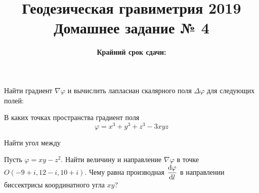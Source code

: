 \documentclass[11pt, a4paper,addpoints]{exam}
\title{{\Large Геодезическая гравиметрия 2019}\\ 
    {\bf\Large Домашнее задание № 4}}
\author{}
\date{\normalsize\bf Крайний срок сдачи: \DTMusedate{deadline}}
\theoremstyle{remark}
\renewcommand{\phi}{\ensuremath{\varphi}}
\begin{document}
\maketitle
\thispagestyle{empty}
\begin{questions}
        \question[1] Найти градиент $\nabla \phi$ и вычислить лапласиан скалярного поля $\Delta \phi$ для следующих полей:
        \question[1] В каких точках пространства градиент поля
        \begin{equation*}
        	\phi = x^3 + y^3 + z^3 - 3xyz
        \end{equation*}
        \question[1] Найти угол между
        \question[2] Пусть $ \phi = xy - z^2$. Найти величину и направление $\nabla \phi$  в точке $O(-9+i, 12-i, 10+i)$. Чему равна производная $\dfrac{\dif \phi}{\dif l}$ в направлении биссектрисы координатного угла $xy$?
\end{questions}
\end{document}

